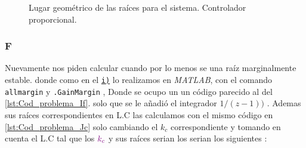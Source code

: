 \begin{figure}[ht]
  \centering
  
  \caption{Lugar geométrico de las raíces para el sistema. Controlador proporcional.}
  \label{fig:lgr-j1}
\end{figure}

\FloatBarrier
\subsubsection{F}%
Nuevamente nos piden calcular cuando por lo menos se una raíz marginalmente estable. donde como en el \hyperref[pregunta-i]{\texttt{i)}} lo realizamos en \textit{MATLAB}, con el comando \verb|allmargin|  y  \verb|.GainMargin| ,  Donde se ocupo un un código parecido al del \autoref{lst:Cod_problema_If}. solo que se le añadió el integrador \(1 /(z-1))\) . Ademas sus raíces correspondientes en L.C las calculamos con el mismo código en \autoref{lst:Cod_problema_Jc} solo cambiando el \(k_c\) correspondiente y tomando en cuenta el L.C tal que los \( \mathbin{\color{violet}k_c}\) y sus raíces serian los  serian los siguientes : 

